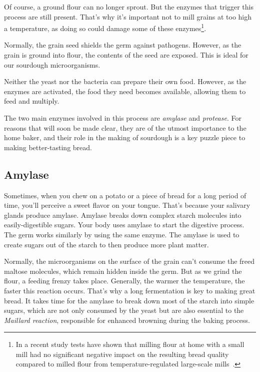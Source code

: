 Of course, a ground flour can no longer sprout. But the enzymes that
trigger this process are still present. That's why it's important not to
mill grains at too high a temperature, as doing so could damage some of
these enzymes\footnote{In a recent study tests have shown that milling flour
at home with a small mill had no significant negative impact on the resulting
bread quality compared to milled flour from temperature-regulated large-scale
mills~\cite{milling+commercial+home+mill+comparison}.}.

Normally, the grain seed shields the germ against pathogens. However, as the
grain is ground into flour, the contents of the seed are exposed. This is ideal
for our sourdough microorganisms.

Neither the yeast nor the bacteria can prepare their own food. However, as
the enzymes are activated, the food they need becomes available, allowing them
to feed and multiply.

The two main enzymes involved in this process are \emph{amylase} and
\emph{protease}. For reasons that will soon be made clear, they are of the
utmost importance to the home baker, and their role in the making of sourdough
is a key puzzle piece to making better-tasting bread.

\subsection{Amylase}

Sometimes, when you chew on a potato or a piece of bread for a long period
of time, you'll perceive a sweet flavor on your tongue. That's because your
salivary glands produce amylase. Amylase breaks down complex starch molecules
into easily-digestible sugars. Your body uses amylase to start the digestive
process. The germ works similarly by using the same enzyme. The amylase
is used to create sugars out of the starch to then produce more plant matter.

Normally,
the microorganisms on the surface of the grain can't consume the freed maltose
molecules, which remain hidden inside the germ. But as we grind the flour, a
feeding frenzy takes place. Generally, the warmer the temperature, the faster
this reaction occurs. That's why a long fermentation is key to making great
bread. It takes time for the amylase to break down most of the starch into
simple sugars, which are not only consumed by the yeast but are also essential
to the \emph{Maillard reaction}, responsible for enhanced browning during the
baking process.

